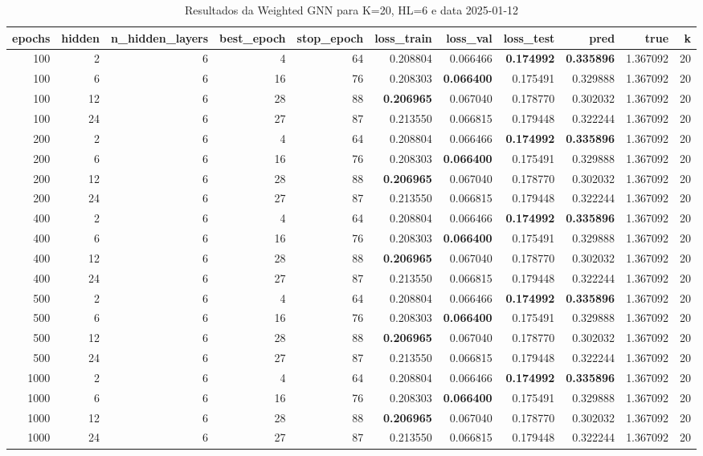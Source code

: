 \begin{table}
\caption{Resultados da Weighted GNN para K=20, HL=6 e data 2025-01-12}
\label{tab:weighted_gnn_results_k20_hl6_d20250112}
\begin{tabular}{rrrrrrrrrrr}
\toprule
epochs & hidden & n\_hidden\_layers & best\_epoch & stop\_epoch & loss\_train & loss\_val & loss\_test & pred & true & k \\
\midrule
100 & 2 & 6 & 4 & 64 & 0.208804 & 0.066466 & \textbf{0.174992} & \textbf{0.335896} & 1.367092 & 20 \\
100 & 6 & 6 & 16 & 76 & 0.208303 & \textbf{0.066400} & 0.175491 & 0.329888 & 1.367092 & 20 \\
100 & 12 & 6 & 28 & 88 & \textbf{0.206965} & 0.067040 & 0.178770 & 0.302032 & 1.367092 & 20 \\
100 & 24 & 6 & 27 & 87 & 0.213550 & 0.066815 & 0.179448 & 0.322244 & 1.367092 & 20 \\
200 & 2 & 6 & 4 & 64 & 0.208804 & 0.066466 & \textbf{0.174992} & \textbf{0.335896} & 1.367092 & 20 \\
200 & 6 & 6 & 16 & 76 & 0.208303 & \textbf{0.066400} & 0.175491 & 0.329888 & 1.367092 & 20 \\
200 & 12 & 6 & 28 & 88 & \textbf{0.206965} & 0.067040 & 0.178770 & 0.302032 & 1.367092 & 20 \\
200 & 24 & 6 & 27 & 87 & 0.213550 & 0.066815 & 0.179448 & 0.322244 & 1.367092 & 20 \\
400 & 2 & 6 & 4 & 64 & 0.208804 & 0.066466 & \textbf{0.174992} & \textbf{0.335896} & 1.367092 & 20 \\
400 & 6 & 6 & 16 & 76 & 0.208303 & \textbf{0.066400} & 0.175491 & 0.329888 & 1.367092 & 20 \\
400 & 12 & 6 & 28 & 88 & \textbf{0.206965} & 0.067040 & 0.178770 & 0.302032 & 1.367092 & 20 \\
400 & 24 & 6 & 27 & 87 & 0.213550 & 0.066815 & 0.179448 & 0.322244 & 1.367092 & 20 \\
500 & 2 & 6 & 4 & 64 & 0.208804 & 0.066466 & \textbf{0.174992} & \textbf{0.335896} & 1.367092 & 20 \\
500 & 6 & 6 & 16 & 76 & 0.208303 & \textbf{0.066400} & 0.175491 & 0.329888 & 1.367092 & 20 \\
500 & 12 & 6 & 28 & 88 & \textbf{0.206965} & 0.067040 & 0.178770 & 0.302032 & 1.367092 & 20 \\
500 & 24 & 6 & 27 & 87 & 0.213550 & 0.066815 & 0.179448 & 0.322244 & 1.367092 & 20 \\
1000 & 2 & 6 & 4 & 64 & 0.208804 & 0.066466 & \textbf{0.174992} & \textbf{0.335896} & 1.367092 & 20 \\
1000 & 6 & 6 & 16 & 76 & 0.208303 & \textbf{0.066400} & 0.175491 & 0.329888 & 1.367092 & 20 \\
1000 & 12 & 6 & 28 & 88 & \textbf{0.206965} & 0.067040 & 0.178770 & 0.302032 & 1.367092 & 20 \\
1000 & 24 & 6 & 27 & 87 & 0.213550 & 0.066815 & 0.179448 & 0.322244 & 1.367092 & 20 \\
\bottomrule
\end{tabular}
\end{table}

